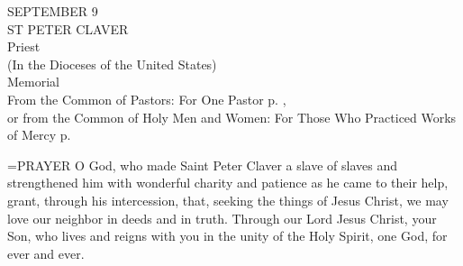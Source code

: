 \begin{center}\normalsize SEPTEMBER 9\\
\footnotesize ST PETER CLAVER\\
\footnotesize Priest\\
\footnotesize (In the Dioceses of the United States)\\
\footnotesize Memorial\\
\footnotesize From the Common of Pastors: For One Pastor p.   , \\
\footnotesize or from the Common of Holy Men and Women: For Those Who Practiced Works of Mercy p.\\
\end{center}

\hangindent=\parindent \small{PRAYER 
O God, who made Saint Peter Claver a slave of slaves
and strengthened him with wonderful charity and patience
as he came to their help,
grant, through his intercession,
that, seeking the things of Jesus Christ,
we may love our neighbor in deeds and in truth.
Through our Lord Jesus Christ, your Son,
who lives and reigns with you in the unity of the Holy Spirit,
one God, for ever and ever.\\}
 

